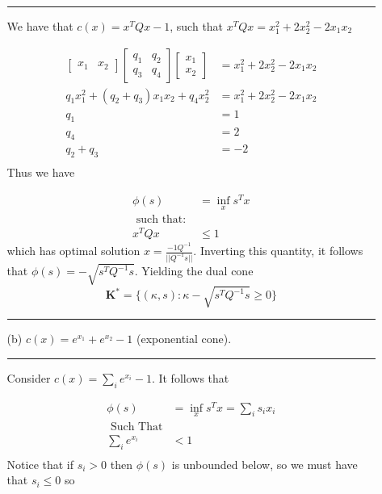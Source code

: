 \documentclass{article} %
\newcommand{\B}[1]{\mathbf#1}
\begin{document}
\begin{enumerate}
\begin{enumerate}
\rule{\textwidth}{1pt}


We have that $c(x) = x^T Q x - 1$, such that $x^T Q x = x_1^2 + 2x_2^2 - 2x_1 x_2$

\begin{equation*}
\begin{aligned}
\begin{bmatrix} x_1 & x_2 \end{bmatrix} \begin{bmatrix} q_1 & q_2 \\ q_3 & q_4 \end{bmatrix} \begin{bmatrix} x_1 \\  x_2 \end{bmatrix} &= x_1^2 + 2x_2^2 - 2x_1 x_2 \\ 
q_1 x_1^2 + (q_2 + q_3) x_1 x_2 + q_4 x_2^2 &=x_1^2 + 2x_2^2 - 2x_1 x_2 \\ 
q_1 &= 1 \\ 
q_4 &= 2 \\ 
q_2 + q_3 &= -2 \\ 
\end{aligned}
\end{equation*}
Thus we have 

\begin{equation*}
\begin{aligned}
\phi(s) &= \inf_x s^{T}x \\ 
\mbox{ such that: } & \\ 
x^{T} Q x &\leq 1
\end{aligned}
\end{equation*}
which has optimal solution $x = \frac{ -1 Q^{-1}}{||Q^{-1} s || }$. Inverting this quantity, it follows that $\phi(s) = - \sqrt{s^T Q^{-1} s}$. Yielding the
dual cone 
\[
\B{K}^{*} = \{(\kappa, s): \kappa - \sqrt{s^T Q^{-1} s} \geq 0 \}
\]

\rule{\textwidth}{1pt}
\item[(b)] $c(x)=e^{x_1}+e^{x_2}-1$ (exponential cone).


\rule{\textwidth}{1pt}
Consider $c(x) = \sum_{i}e^{x_i} -1$. It follows that 

\begin{equation*}
\begin{aligned}
\phi(s) &= \inf_x s^T x = \sum_i s_i x_i \\ 
\mbox{ Such That} & \\ 
\sum_{i} e^{x_i} &< 1 \\ 
\end{aligned}
\end{equation*}
Notice that if $s_i > 0$ then $\phi(s)$ is unbounded below, so we must have that $s_i \leq 0$ so 


\end{enumerate}
\end{enumerate}
\end{document}
